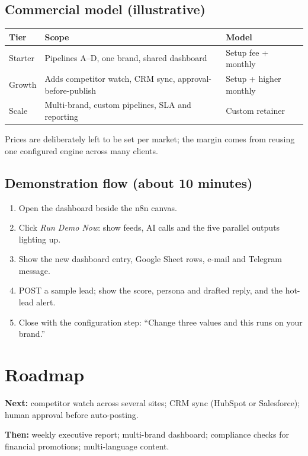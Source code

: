 \documentclass[11pt,a4paper]{article}
\begin{document}
\subsection{Commercial model (illustrative)}
\begin{center}
\begin{tabularx}{\linewidth}{@{}lXl@{}}
\toprule
\textbf{Tier} & \textbf{Scope} & \textbf{Model}\\
\midrule
Starter & Pipelines A--D, one brand, shared dashboard & Setup fee + monthly\\
Growth & Adds competitor watch, CRM sync, approval-before-publish & Setup + higher monthly\\
Scale & Multi-brand, custom pipelines, SLA and reporting & Custom retainer\\
\bottomrule
\end{tabularx}
\end{center}
Prices are deliberately left to be set per market; the margin comes from reusing one configured
engine across many clients.

\subsection{Demonstration flow (about 10 minutes)}
\begin{enumerate}[label=\textbf{\arabic*.}]
  \item Open the dashboard beside the n8n canvas.
  \item Click \textit{Run Demo Now}: show feeds, AI calls and the five parallel outputs lighting up.
  \item Show the new dashboard entry, Google Sheet rows, e-mail and Telegram message.
  \item POST a sample lead; show the score, persona and drafted reply, and the hot-lead alert.
  \item Close with the configuration step: ``Change three values and this runs on your brand.''
\end{enumerate}

\section{Roadmap}
\textbf{Next:} competitor watch across several sites; CRM sync (HubSpot or Salesforce); human approval before auto-posting.

\textbf{Then:} weekly executive report; multi-brand dashboard; compliance checks for financial promotions; multi-language content.
\end{document}
